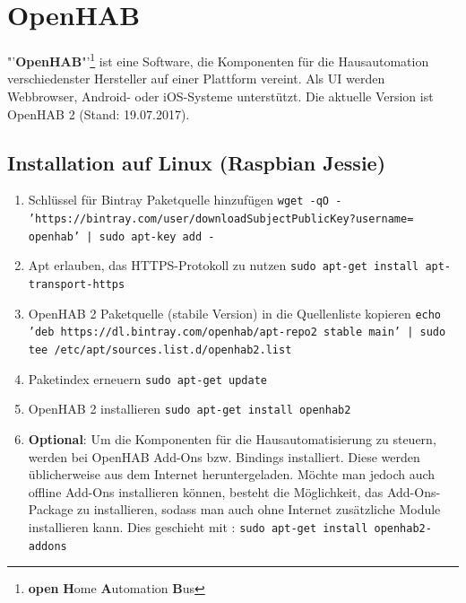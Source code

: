\section{OpenHAB}
"'\textbf{OpenHAB}"'\footnote{\textbf{open} \textbf{H}ome \textbf{A}utomation \textbf{B}us} ist eine Software, die Komponenten für die Hausautomation verschiedenster Hersteller auf einer Plattform vereint. Als UI werden Webbrowser, Android- oder iOS-Systeme unterstützt. Die aktuelle Version ist OpenHAB 2 (Stand: 19.07.2017). \newline

\subsection{Installation auf Linux (Raspbian Jessie)}

\begin{enumerate}
	\item Schlüssel für Bintray Paketquelle hinzufügen \newline
	\texttt{wget -qO - 'https://bintray.com/user/downloadSubjectPublicKey?username=\\openhab' | sudo apt-key add -}
	
	\item Apt erlauben, das HTTPS-Protokoll zu nutzen\newline
	\texttt{sudo apt-get install apt-transport-https}
	
	\item OpenHAB 2 Paketquelle (stabile Version) in die Quellenliste kopieren\newline
	\texttt{echo 'deb https://dl.bintray.com/openhab/apt-repo2 stable main' | sudo tee /etc/apt/sources.list.d/openhab2.list}
	
	\item Paketindex erneuern\newline
	\texttt{sudo apt-get update}
	
	\item OpenHAB 2 installieren\newline
	\texttt{sudo apt-get install openhab2}
	
	\item \textbf{Optional}: Um die Komponenten für die Hausautomatisierung zu steuern, werden bei OpenHAB Add-Ons bzw. Bindings installiert. Diese werden üblicherweise aus dem Internet heruntergeladen. Möchte man jedoch auch offline Add-Ons installieren können, besteht die Möglichkeit, das Add-Ons-Package zu installieren, sodass man auch ohne Internet zusätzliche Module installieren kann. Dies geschieht mit : \texttt{sudo apt-get install openhab2-addons} \cite{c2}
	

\end{enumerate}
